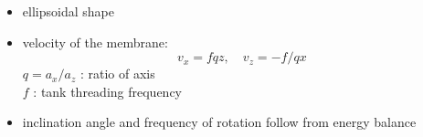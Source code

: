 

\bcc

\bc

\begin{itemize}
\item
ellipsoidal shape \\
\item velocity of the membrane:
\begin{equation*}
v_x = f q z, \quad v_z = - f / q x
\end{equation*}
$q = a_x/a_z$ : ratio of axis \\
$f$           : tank threading frequency

\item inclination angle and frequency of rotation follow from energy balance \\
\end{itemize}

\ec

\bc
\begin{center}
\end{center}
\ec

\ecc
\eframe
